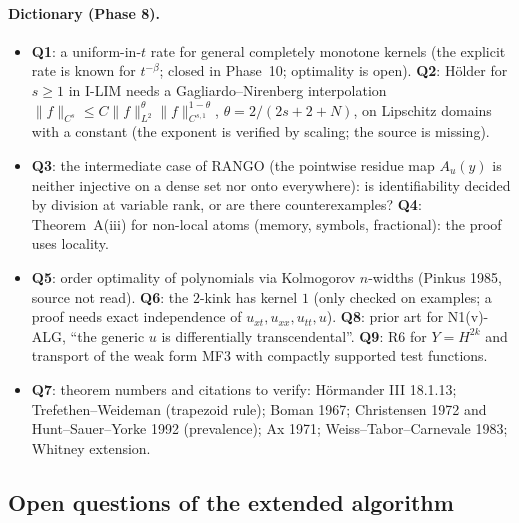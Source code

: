 \paragraph{Dictionary (Phase 8).}
\begin{itemize}
\item \textbf{Q1}: a uniform-in-$t$ rate for general completely monotone kernels (the explicit rate is known for $t^{-\beta}$; closed in Phase~10; optimality is open). \textbf{Q2}: H\"older for $s\ge1$ in I-LIM needs a Gagliardo--Nirenberg interpolation $\|f\|_{C^s}\le C\|f\|_{L^2}^\theta\|f\|_{C^{s,1}}^{1-\theta}$, $\theta=2/(2s+2+N)$, on Lipschitz domains with a constant (the exponent is verified by scaling; the source is missing).
\item \textbf{Q3}: the intermediate case of RANGO (the pointwise residue map $A_u(y)$ is neither injective on a dense set nor onto everywhere): is identifiability decided by division at variable rank, or are there counterexamples? \textbf{Q4}: Theorem~A(iii) for non-local atoms (memory, symbols, fractional): the proof uses locality.
\item \textbf{Q5}: order optimality of polynomials via Kolmogorov $n$-widths (Pinkus 1985, source not read). \textbf{Q6}: the $2$-kink has kernel $1$ (only checked on examples; a proof needs exact independence of $u_{xt},u_{xx},u_{tt},u$). \textbf{Q8}: prior art for N1(v)-ALG, ``the generic $u$ is differentially transcendental''. \textbf{Q9}: R6 for $Y=H^{2k}$ and transport of the weak form MF3 with compactly supported test functions.
\item \textbf{Q7}: theorem numbers and citations to verify: H\"ormander III 18.1.13; Trefethen--Weideman (trapezoid rule); Boman 1967; Christensen 1972 and Hunt--Sauer--Yorke 1992 (prevalence); Ax 1971; Weiss--Tabor--Carnevale 1983; Whitney extension.
\end{itemize}

\subsection{Open questions of the extended algorithm}

